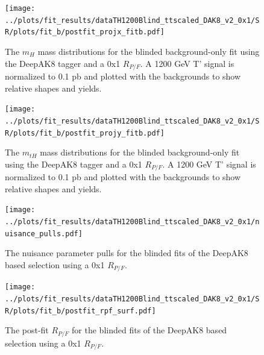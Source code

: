 \documentclass[10pt,oneside]{article}
\begin{document}
\begin{figure}[H]
    \centering
    \texttt{[image: ../plots/fit\_results/dataTH1200Blind\_ttscaled\_DAK8\_v2\_0x1/SR/plots/fit\_b/postfit\_projx\_fitb.pdf]}
    \caption{The $m_H$ mass distributions for the blinded background-only fit using the DeepAK8 tagger and a 0x1 $R_{P/F}$.
    A 1200 GeV T' signal is normalized to 0.1 pb and plotted with the backgrounds to show relative shapes and yields.}
    \label{figs:DAK8_mh_0x1}
\end{figure}
\begin{figure}[H]
    \centering
    \texttt{[image: ../plots/fit\_results/dataTH1200Blind\_ttscaled\_DAK8\_v2\_0x1/SR/plots/fit\_b/postfit\_projy\_fitb.pdf]}
    \caption{The $m_{tH}$ mass distributions for the blinded background-only fit using the DeepAK8 tagger and a 0x1 $R_{P/F}$.
    A 1200 GeV T' signal is normalized to 0.1 pb and plotted with the backgrounds to show relative shapes and yields.}
    \label{figs:DAK8_mth_0x1}
\end{figure}
\begin{figure}[H]
    \centering
    \texttt{[image: ../plots/fit\_results/dataTH1200Blind\_ttscaled\_DAK8\_v2\_0x1/nuisance\_pulls.pdf]}
    \caption{The nuisance parameter pulls for the blinded fits of the DeepAK8 based selection using a 0x1 $R_{P/F}$.}
    \label{figs:DAK8_nuis_0x1}
\end{figure}
\begin{figure}[H]
    \centering
    \texttt{[image: ../plots/fit\_results/dataTH1200Blind\_ttscaled\_DAK8\_v2\_0x1/SR/plots/fit\_b/postfit\_rpf\_surf.pdf]}
    \caption{The post-fit $R_{P/F}$ for the blinded fits of the DeepAK8 based selection using a 0x1 $R_{P/F}$.}
    \label{figs:DAK8_rpf_0x1}
\end{figure}
\end{document}

